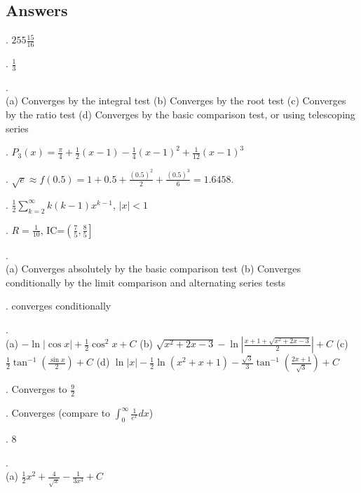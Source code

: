 \documentclass[12pt]{article}
\begin{document}
\subsection*{Answers}

.  $255 {\frac{15}{16}}$
\medskip

.  ${\frac{1}{3}}$
\medskip

. \\
(a) Converges by the integral test \hfil\break
(b) Converges by the root test \hfil\break
(c) Converges by the ratio test \hfil\break
(d) Converges by the basic comparison test, or using telescoping series
\medskip

.  $P_3(x) = {\frac{\pi}{4}} + {\frac{1}{2}} (x-1) - 
{\frac{1}{4}} (x-1)^2 + {\frac{1}{12}} (x-1)^3$
\medskip

.  $\sqrt{e} \approx f(0.5) = 1 + 0.5 + {\frac{(0.5)^2}{2}} + 
{\frac{(0.5)^3}{6}} = 1.6458.$
\medskip

.  ${\frac{1}{2}} \sum_{k=2}^{\infty} k(k-1)x^{k-1}$, $|x| < 1$
\medskip

.  $R={\frac{1}{10}}$, IC=$\left ( {\frac{7}{5}}, 
{\frac{8}{5}} \right ]$
\medskip

. \\
(a) Converges absolutely by the basic comparison test \hfil\break 
(b) Converges conditionally by the limit comparison and alternating series tests
\medskip

. converges conditionally  
\medskip

.\\
(a) $- \ln |\cos x | + {\frac{1}{2}} \cos^2 x + C$ \hfil\break
(b) $\sqrt{x^2+2x-3} - \ln | {\frac{x+1+\sqrt{x^2+2x-3}}{2}} | + C$
\hfil\break
(c) ${\frac{1}{2}} \tan^{-1} \left ( {\frac{\sin x}{2}} \right ) + C$
\hfil\break
(d) $\ln |x| - {\frac{1}{2}} \ln (x^2+x+1) - {\frac{\sqrt{3}}{3}} \tan^{-1}
\left ( {\frac{2x+1}{\sqrt{3}}} \right ) + C$
\medskip

.  Converges to ${\frac{9}{2}}$
\medskip

. Converges (compare to $\int_0^{\infty} {\frac{1}{e^x}} dx$)
\medskip

.  8 
\medskip

.\\

\noindent (a) $\frac{1}{2} x^2 + {\frac{4}{\sqrt{x}}} - {\frac{1}{3x^3}} + C$\\
\end{document}
